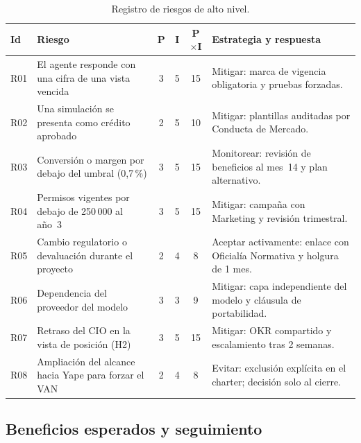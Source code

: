 \documentclass[11pt,a4paper]{article}
\begin{document}
\begin{table}[H]
\centering
\caption{Registro de riesgos de alto nivel.}
\small
\setlength{\tabcolsep}{4pt}
\begin{tabularx}{\textwidth}{@{}l X c c c X@{}}
\toprule
\textbf{Id} & \textbf{Riesgo} & \textbf{P} & \textbf{I} & \textbf{P$\times$I} & \textbf{Estrategia y respuesta} \\
\midrule
\rowcolor{suave} R01 & El agente responde con una cifra de una vista vencida & 3 & 5 & 15 & Mitigar: marca de vigencia obligatoria y pruebas forzadas. \\
R02 & Una simulación se presenta como crédito aprobado & 2 & 5 & 10 & Mitigar: plantillas auditadas por Conducta de Mercado. \\
\rowcolor{suave} R03 & Conversión o margen por debajo del umbral (0,7\,\%) & 3 & 5 & 15 & Monitorear: revisión de beneficios al mes~14 y plan alternativo. \\
\rowcolor{suave} R04 & Permisos vigentes por debajo de 250\,000 al año~3 & 3 & 5 & 15 & Mitigar: campaña con Marketing y revisión trimestral. \\
R05 & Cambio regulatorio o devaluación durante el proyecto & 2 & 4 & 8 & Aceptar activamente: enlace con Oficialía Normativa y holgura de 1 mes. \\
R06 & Dependencia del proveedor del modelo & 3 & 3 & 9 & Mitigar: capa independiente del modelo y cláusula de portabilidad. \\
\rowcolor{suave} R07 & Retraso del CIO en la vista de posición (H2) & 3 & 5 & 15 & Mitigar: OKR compartido y escalamiento tras 2 semanas. \\
R08 & Ampliación del alcance hacia Yape para forzar el VAN & 2 & 4 & 8 & Evitar: exclusión explícita en el charter; decisión solo al cierre. \\
\bottomrule
\end{tabularx}
\end{table}

\subsection{Beneficios esperados y seguimiento}
\end{document}
